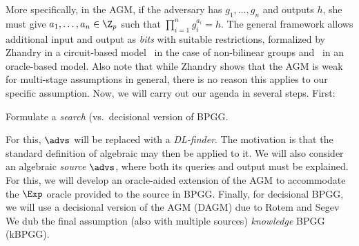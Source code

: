 {\begin{itemize}
\iffalse
More specifically, in the AGM, if the adversary has $g_1,\ldots,g_n$ and outputs $h$, she must give  $a_1,\ldots,a_n \in \Z_p$ such that $\prod_{i=1}^n g_i^{a_i} = h$. The general framework  allows additional input and output as \emph{bits} with suitable restrictions, formalized by Zhandry in a circuit-based model~\cite{} in the case of non-bilinear groups and~\cite{} in an oracle-based model.
Also note that while Zhandry shows that the AGM is  weak for multi-stage assumptions in general, there is no reason this applies to our specific assumption.
Now, we will carry out our agenda in several steps.  First:
\begin{task}
    Formulate  a \emph{search} (vs.~decisional version of BPGG. 
\end{task} 
For this, $\advs$ will be replaced with a \emph{DL-finder}. The motivation is that the standard definition of algebraic may then be applied to it.  We will also consider an algebraic \emph{source} $\advs$, where both its queries and output must be explained.  For this, we will 
 develop an oracle-aided extension of the AGM to accommodate the $\Exp$ oracle provided to the source in BPGG. %
 Finally, for decisional BPGG, we will use a decisional  version of the AGM (DAGM) due to Rotem and Segev~\cite{TCC:RotSeg20}  We dub the final assumption (also with multiple sources) \emph{knowledge} BPGG (kBPGG). 

\end{itemize}}
